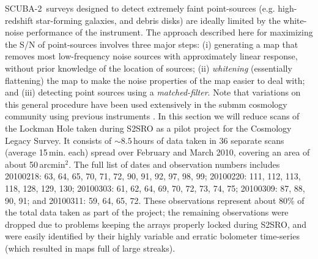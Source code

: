 \documentclass[useAMS,usenatbib,nofootinbib]{mn2e}
\newcommand{\scuba}{SCUBA-2}
\begin{document}
\scuba\ surveys designed to detect extremely faint point-sources
(e.g. high-redshift star-forming galaxies, and debris disks) are
ideally limited by the white-noise performance of the instrument. The
approach described here for maximizing the S/N of point-sources
involves three major steps: (i) generating a map that removes most
low-frequency noise sources with approximately linear response,
without prior knowledge of the location of sources; (ii)
\emph{whitening} (essentially flattening) the map to make the noise
properties of the map easier to deal with; and (iii) detecting point
sources using a \emph{matched-filter}. Note that variations on this
general procedure have been used extensively in the submm cosmology
community using previous instruments
\citep[e.g.][]{scott2002,laurent2005,coppin2006,scott2008,perera2008,devlin2009}.
In this section we will reduce scans of the Lockman Hole taken during
S2SRO as a pilot project for the Cosmology Legacy Survey. It consists
of $\sim8.5$\,hours of data taken in 36 separate scans (average
15\,min. each) spread over February and March 2010, covering an area
of about 50\,arcmin$^2$. The full list of dates and observation
numbers includes 20100218: 63, 64, 65, 70, 71, 72, 90, 91, 92, 97, 98,
99; 20100220: 111, 112, 113, 118, 128, 129, 130; 20100303: 61, 62, 64,
69, 70, 72, 73, 74, 75; 20100309: 87, 88, 90, 91; and 20100311: 59,
64, 65, 72. These observations represent about 80\% of the total data
taken as part of the project; the remaining observations were dropped
due to problems keeping the arrays properly locked during S2SRO, and
were easily identified by their highly variable and erratic bolometer
time-series (which resulted in maps full of large streaks).
\end{document}
